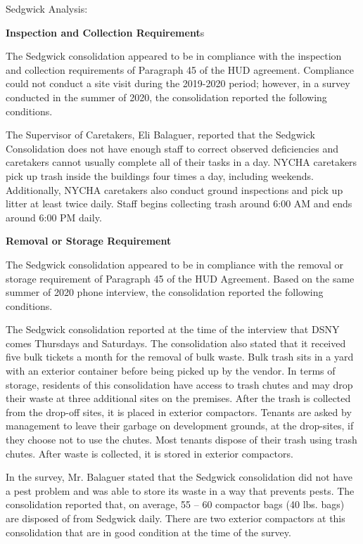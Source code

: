 Sedgwick Analysis: 



\textbf{Inspection and Collection Requirement}s 

 

The Sedgwick consolidation appeared to be in compliance with the inspection and collection requirements of Paragraph 45 of the HUD agreement. Compliance could not conduct a site visit during the 2019-2020 period; however, in a survey conducted in the summer of 2020, the consolidation reported the following conditions.



The Supervisor of Caretakers, Eli Balaguer, reported that the Sedgwick Consolidation does not have enough staff to correct observed deficiencies and caretakers cannot usually complete all of their tasks in a day. NYCHA caretakers pick up trash inside the buildings four times a day, including weekends. Additionally, NYCHA caretakers also conduct ground inspections and pick up litter at least twice daily. Staff begins collecting trash around 6:00 AM and ends around 6:00 PM daily. 

 

\textbf{Removal or Storage Requirement} 



The Sedgwick consolidation appeared to be in compliance with the removal or storage requirement of Paragraph  45 of the HUD Agreement. Based on the same summer of  2020 phone interview, the consolidation reported the following conditions.

  

The Sedgwick consolidation reported at the time of the interview that DSNY comes Thursdays and Saturdays. The consolidation also stated that it received five bulk tickets a month for the removal of bulk waste. Bulk trash sits in a yard with an exterior container before being picked up by the vendor.  In terms of storage, residents of this consolidation have access to trash chutes and may drop their waste at three additional sites on the premises. After the trash is collected from the drop-off sites, it is placed in exterior compactors. Tenants are asked by management to leave their garbage on development grounds, at the drop-sites, if they choose not to use the chutes. Most tenants dispose of their trash using trash chutes. After waste is collected, it is stored in exterior compactors.

 

In the survey, Mr. Balaguer stated that the Sedgwick consolidation did not have a pest problem and was able to store its waste in a way that prevents pests. The consolidation reported that, on average, 55 -- 60 compactor bags (40 lbs. bags) are disposed of from Sedgwick daily. There are two exterior compactors at this consolidation that are in good condition at the time of the survey.



